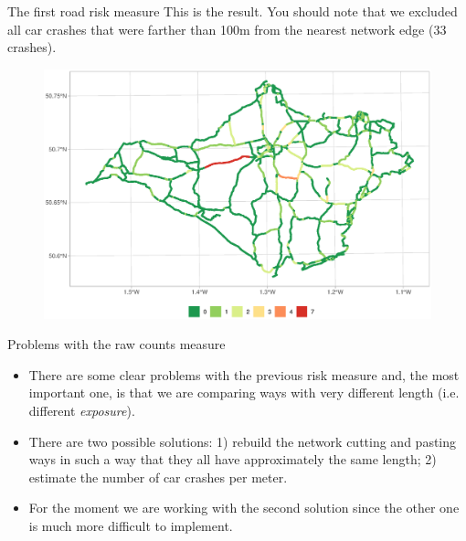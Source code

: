 \documentclass[c,10pt,pdftex]{beamer}
\begin{document}
\begin{frame}{The first road risk measure}
\vspace{-0.25cm}
This is the result. You should note that we excluded all car crashes that were farther than 100m from the nearest network edge (33  crashes). 
\begin{figure}
	\centering
	\includegraphics[width=\linewidth]{images/count_on_nearest_street}
\end{figure}
\end{frame}

\begin{frame}{Problems with the raw counts measure}
\begin{itemize}
	\setlength\itemsep{1em}
	\item There are some clear problems with the previous risk measure and, the most important one, is that we are comparing ways with very different length (i.e. different \textit{exposure}). 
	\item There are two possible solutions: 1) rebuild the network cutting and pasting ways in such a way that they all have approximately the same length; 2) estimate the number of car crashes per meter. 
	\item For the moment we are working with the second solution since the other one is much more difficult to implement. 
\end{itemize}
\end{frame}
\end{document}
